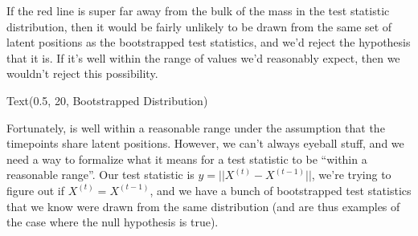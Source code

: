 \documentclass[letterpaper,10pt,english]{jupyterBook}
\begin{document}
\sphinxAtStartPar
If the red line is super far away from the bulk of the mass in the test statistic distribution, then it would be fairly unlikely to be drawn from the same set of latent positions as the bootstrapped test statistics, and we’d reject the hypothesis that it is. If it’s well within the range of values we’d reasonably expect, then we wouldn’t reject this possibility.

\begin{sphinxVerbatim}[commandchars=\\\{\}]
  
  \PYG{p}{[}\PYG{p}{]}
   
      
      
      \PYG{p}{[} \PYG{p}{]}
  
\end{sphinxVerbatim}

\begin{sphinxVerbatim}[commandchars=\\\{\}]
Text(0.5, 20, \PYGZsq{}Bootstrapped Distribution\PYGZsq{})
\end{sphinxVerbatim}

\noindent{}

\sphinxAtStartPar
Fortunately,  is well within a reasonable range under the assumption that the time\sphinxhyphen{}points share latent positions. However, we can’t always eyeball stuff, and we need a way to formalize what it means for a test statistic to be “within a reasonable range”. Our test statistic is  \(y = ||X^{(t)} - X^{(t-1)}||\), we’re trying to figure out if \(X^{(t)} = X^{(t-1)}\), and we have a bunch of bootstrapped test statistics that we know were drawn from the same distribution (and are thus examples of the case where the null hypothesis is true).
\end{document}
